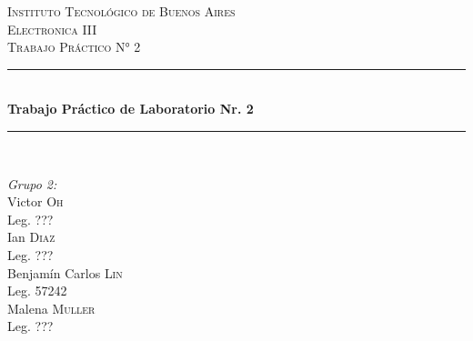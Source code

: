 \begin{titlepage}
    
\newcommand{\HRule}{\rule{\linewidth}{0.5mm}} %
    
\center %
     
    
\textsc{\LARGE Instituto Tecnológico de Buenos Aires}\\[2cm] %
\textsc{\Large Electronica III}\\[1.5cm] %
\textsc{\large Trabajo Práctico N° 2}\\[0.5cm] %
    
    
\HRule \\[0.5cm]
{ \huge \bfseries Trabajo Práctico de Laboratorio Nr. 2}\\[0.4cm] %
\HRule \\[2cm]
     
    
\begin{minipage}{0.4\textwidth}
\begin{flushleft} \large
\emph{Grupo 2:}\\		%
[.3cm]
Victor \textsc{Oh}\\
Leg. ???\\ 
[.3cm]
Ian \textsc{Diaz}\\
Leg. ???\\ 
[.3cm]
Benjamín Carlos \textsc{Lin}\\
Leg. 57242 \\ 
[.3cm]
Malena \textsc{Muller}\\
Leg. ???\\ 
[.3cm]
\end{flushleft}
\end{minipage}
~
\begin{minipage}{0.4\textwidth}
\begin{flushright} \large
\end{flushright}
\end{minipage}\\[2cm]
    

\end{titlepage}
